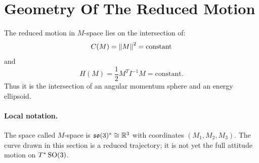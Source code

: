 \section{Geometry Of The Reduced Motion}
\label{sec:rigid-reduced-geometry}

The reduced motion in \(M\)-space lies on the intersection of:
\[
  C(M)=\left\lVert M\right\rVert^2=\text{constant}
\]
and
\[
  H(M)=\frac12M^TI^{-1}M=\text{constant}.
\]
Thus it is the intersection of an angular momentum sphere and an energy
ellipsoid.

\paragraph{Local notation.}
The space called \(M\)-space is \(\mathfrak{so}(3)^*\cong\mathbb{R}^3\) with coordinates
\((M_1,M_2,M_3)\).  The curve drawn in this section is a reduced trajectory;
it is not yet the full attitude motion on \(T^*\operatorname{SO}(3)\).

